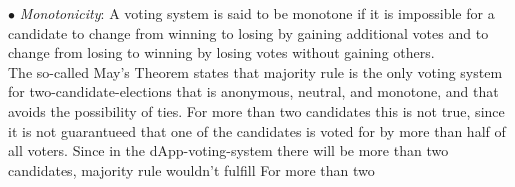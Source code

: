 $\bullet$ {\emph{Monotonicity}}: A voting system is said to be monotone if it is impossible for a candidate to change from winning to losing by gaining additional votes and to change from losing to winning by losing votes without gaining others. \\

The so-called May's Theorem states that majority rule %
is the only voting system for two-candidate-elections that is anonymous, neutral, and monotone, and that avoids the possibility of ties. For more than two candidates this is not true, since it is not guarantueed that one of the candidates is voted for by more than half of all voters. Since in the dApp-voting-system there will be more than two candidates, majority rule wouldn't fulfill %
For more than two 


